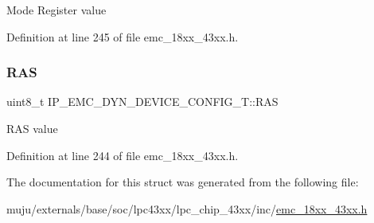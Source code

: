 Mode Register value 

Definition at line 245 of file emc\+\_\+18xx\+\_\+43xx.\+h.

\mbox{\label{struct_i_p___e_m_c___d_y_n___d_e_v_i_c_e___c_o_n_f_i_g___t_ae712583a182845c0eb500202fa49a025}} 
\subsubsection{\texorpdfstring{R\+AS}{RAS}}
{\footnotesize\ttfamily uint8\+\_\+t I\+P\+\_\+\+E\+M\+C\+\_\+\+D\+Y\+N\+\_\+\+D\+E\+V\+I\+C\+E\+\_\+\+C\+O\+N\+F\+I\+G\+\_\+\+T\+::\+R\+AS}

R\+AS value 

Definition at line 244 of file emc\+\_\+18xx\+\_\+43xx.\+h.



The documentation for this struct was generated from the following file\+:\begin{DoxyCompactItemize}
\item 
muju/externals/base/soc/lpc43xx/lpc\+\_\+chip\+\_\+43xx/inc/\hyperlink{emc__18xx__43xx_8h}{emc\+\_\+18xx\+\_\+43xx.\+h}\end{DoxyCompactItemize}
